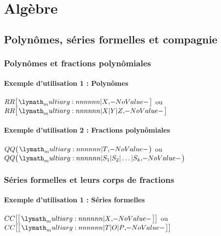 \documentclass[12pt,a4paper]{article}
\newcommand\QQ{QQ}
\newcommand\RR{RR}
\newcommand\CC{CC}
\begin{document}
\section{Algèbre}

\subsection{Polynômes, séries formelles et compagnie}

\subsubsection{Polynômes et fractions polynômiales}

\paragraph{Exemple d'utilisation 1 : Polynômes}

\begin{latexex}
$\setpoly{\RR}{X}$
ou
$\setpoly{\RR}{X | Y | Z}$
\end{latexex}




\paragraph{Exemple d'utilisation 2 : Fractions polynômiales}

\begin{latexex}
$\setpolyfrac{\QQ}{T}$
ou
$\setpolyfrac{\QQ}%
             {S_1 | S_2 | \dots | S_k}$
\end{latexex}




\subsubsection{Séries formelles et leurs corps de fractions}

\paragraph{Exemple d'utilisation 1 : Séries formelles}

\begin{latexex}
$\setserie{\CC}{X}$
ou
$\setserie{\CC}{T | O | P}$
\end{latexex}


\end{document}
